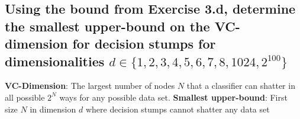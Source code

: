 \documentclass[11pt,a4paper]{article}
\begin{document}
\subsection{Using the bound from Exercise 3.d, determine the smallest upper-bound on the VC-dimension for decision stumps for dimensionalities $d ∈ \{1, 2, 3, 4, 5, 6, 7, 8, 1024, 2^{100}\}$}
\label{sec:3e}
\textbf{VC-Dimension}: The largest number of nodes $N$ that a classifier can shatter in all possible $2^N$ ways for any possible data set.
\textbf{Smallest upper-bound}: First size $N$ in dimension $d$ where decision stumps cannot shatter any data set
\end{document}
